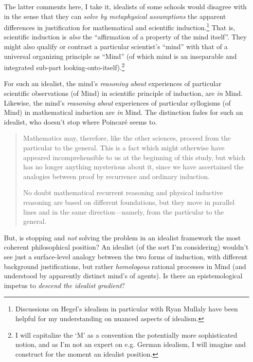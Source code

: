 The latter comments here, I take it, idealists of some schools would disagree with in the sense that they can \emph{solve by metaphysical assumptions} the apparent differences in justification for mathematical and scientific induction.\footnote{Discussions on Hegel's idealism in particular with Ryan Mullaly have been helpful for my understanding on nuanced aspects of idealism.}  That is, scientific induction is \emph{also} the ``affirmation of a property of the mind itself''.  They might also qualify or contrast a particular scientist's ``mind'' with that of a universal organizing principle as ``Mind'' (of which mind is an inseparable and integrated sub-part looking-onto-itself).\footnote{I will capitalize the `M' as a convention the potentially more sophisticated notion, and as I'm not an expert on e.g. German idealism, I will imagine and construct for the moment an idealist position.}

For such an idealist, the mind's \emph{reasoning about} experiences of particular scientific observations (of Mind) in scientific principle of induction, are \emph{in} Mind.  Likewise, the mind's \emph{reasoning about} experiences of particular syllogisms (of Mind) in mathematical induction are \emph{in} Mind.  The distinction fades for such an idealist, who doesn't stop where Poincar\'e seems to.  

\begin{quote}
    Mathematics may, therefore, like the other sciences, proceed from the particular to the general.  This is a fact which might otherwise have appeared incomprehensible to us at the beginning of this study, but which has no longer anything mysterious about it, since we have ascertained the analogies between proof by recurrence and ordinary induction.
    
    No doubt mathematical recurrent reasoning and physical inductive reasoning are based on different foundations, but they move in parallel lines and in the same direction---namely, from the particular to the general.
    
    \citep[p. 14]{Poincare1952}
\end{quote}

But, is stopping and \emph{not} solving the problem in an idealist framework the most coherent philosophical position?  An idealist (of the sort I'm considering) wouldn't see just a surface-level analogy between the two forms of induction, with different background justifications, but rather \emph{homologous} rational processes in Mind (and understood by apparently distinct mind's of agents).  Is there an epistemological impetus to \emph{descend the idealist gradient}?

